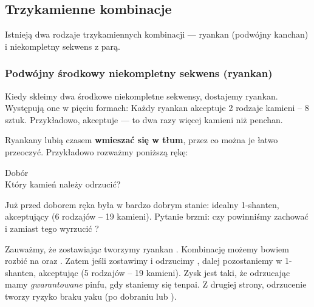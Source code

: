 \newpage
\subsection{Trzykamienne kombinacje}
Istnieją dwa rodzaje trzykamiennych kombinacji --- {\jap ryankan} (podwójny {\jap kanchan}) i niekompletny sekwens z parą.

\subsubsection{Podwójny środkowy niekompletny sekwens ({\jap ryankan})} \label{sec:ryankan}
Kiedy skleimy dwa środkowe niekompletne sekwensy, dostajemy {\jap ryankan}.
Występują one w pięciu formach:
{
}
Każdy {\jap ryankan} akceptuje 2 rodzaje kamieni -- 8 sztuk.
Przykładowo,  akceptuje  --- to dwa razy więcej kamieni niż {\jap penchan}.

\bigskip
{\jap Ryankan}y lubią czasem {\bf wmieszać się w tłum}, przez co można je łatwo przeoczyć.
Przykładowo rozważmy poniższą rękę:
\begin{screen}
	\vspace{-15pt}\hfill{\footnotesize{Dobór~~~~~~~~~}}\\
	\vspace{-2pt}Który kamień należy odrzucić?\vspace{-5pt}
\end{screen}
Już przed doborem  ręka była w bardzo dobrym stanie: idealny 1-{\jap shanten}, akceptujący  (6 rodzajów -- 19 kamieni).
Pytanie brzmi: czy powinniśmy zachować  i zamiast tego wyrzucić ?

\bigskip
Zauważmy, że zostawiając  tworzymy {\jap ryankan} .
Kombinację  możemy bowiem rozbić na  oraz .
Zatem jeśli zostawimy  i odrzucimy , dalej pozostaniemy w 1-{\jap shanten}, akceptując  (5 rodzajów -- 19 kamieni).
Zysk jest taki, że odrzucając  mamy \emph{gwarantowane} {\jap pinfu}, gdy staniemy się {\jap tenpai}.
Z drugiej strony, odrzucenie  tworzy ryzyko braku {\jap yaku} (po dobraniu  lub ).

